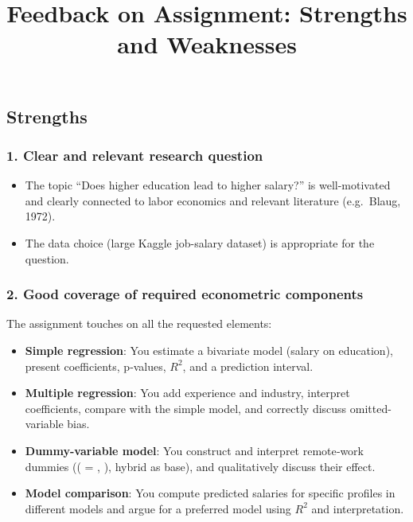 \documentclass[
  letterpaper,
  DIV=11,
  numbers=noendperiod]{scrartcl}
\title{Feedback on Assignment: Strengths and Weaknesses}
\author{}
\date{}
\providecommand{\tightlist}{%
  \setlength{\itemsep}{0pt}\setlength{\parskip}{0pt}}
\renewcommand*\contentsname{Table of contents}
\newcommand\contentsname{Table of contents}
\begin{document}
\maketitle

\renewcommand*\contentsname{Table of contents}
{
\setcounter{tocdepth}{3}
\tableofcontents
}
\listoffigures
\listoftables

\subsection{Strengths}\label{strengths}

\subsubsection{1. Clear and relevant research
question}\label{clear-and-relevant-research-question}

\begin{itemize}
\tightlist
\item
  The topic ``Does higher education lead to higher salary?'' is
  well-motivated and clearly connected to labor economics and relevant
  literature (e.g.~Blaug, 1972).\\
\item
  The data choice (large Kaggle job-salary dataset) is appropriate for
  the question.
\end{itemize}

\subsubsection{2. Good coverage of required econometric
components}\label{good-coverage-of-required-econometric-components}

The assignment touches on all the requested elements:

\begin{itemize}
\tightlist
\item
  \textbf{Simple regression}: You estimate a bivariate model (salary on
  education), present coefficients, p‑values, \(R^2\), and a prediction
  interval.\\
\item
  \textbf{Multiple regression}: You add experience and industry,
  interpret coefficients, compare with the simple model, and correctly
  discuss omitted-variable bias.\\
\item
  \textbf{Dummy-variable model}: You construct and interpret remote‑work
  dummies ((  = ,  ), hybrid as base),
  and qualitatively discuss their effect.\\
\item
  \textbf{Model comparison}: You compute predicted salaries for specific
  profiles in different models and argue for a preferred model using
  \(R^2\) and interpretation.
\end{itemize}
\end{document}
